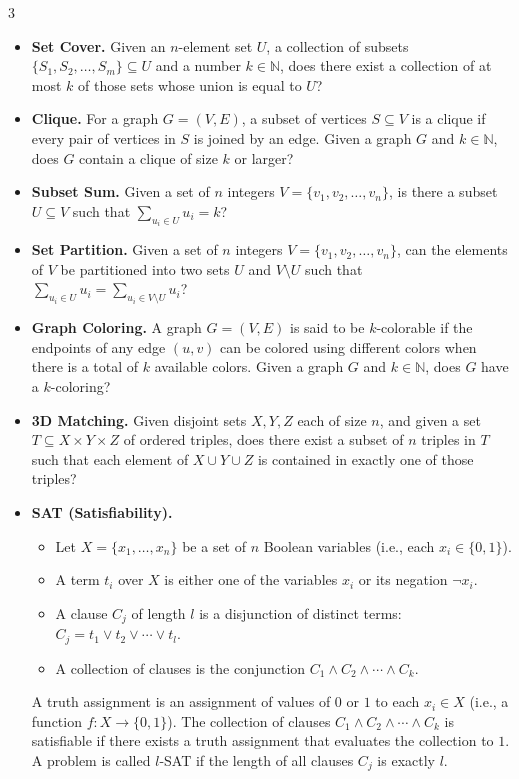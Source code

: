 \documentclass[letterpaper]{article}
\begin{document}
\begin{multicols*}{3}
\begin{itemize}
        \item \textbf{Set Cover.} Given an $n$-element set $U$, a collection of subsets $\{S_1, S_2, \ldots, S_m\} \subseteq U$ and a number $k \in \mathbb{N}$, does there exist a collection of at most $k$ of those sets whose union is equal to $U$?

        \item \textbf{Clique.} For a graph $G = (V,E)$, a subset of vertices $S \subseteq V$ is a clique if every pair of vertices in $S$ is joined by an edge. Given a graph $G$ and $k \in \mathbb{N}$, does $G$ contain a clique of size $k$ or larger?

        \item \textbf{Subset Sum.} Given a set of $n$ integers $V = \{v_1, v_2, \ldots, v_n\}$, is there a subset $U \subseteq V$ such that $\sum_{u_i \in U} u_i = k$?

        \item \textbf{Set Partition.} Given a set of $n$ integers $V = \{v_1, v_2, \ldots, v_n\}$, can the elements of $V$ be partitioned into two sets $U$ and $V \setminus U$ such that $\sum_{u_i \in U} u_i = \sum_{u_i \in V \setminus U} u_i$?

        \item \textbf{Graph Coloring.} A graph $G = (V,E)$ is said to be $k$-colorable if the endpoints of any edge $(u,v)$ can be colored using different colors when there is a total of $k$ available colors. Given a graph $G$ and $k \in \mathbb{N}$, does $G$ have a $k$-coloring?

        \item \textbf{3D Matching.} Given disjoint sets $X, Y, Z$ each of size $n$, and given a set $T \subseteq X \times Y \times Z$ of ordered triples, does there exist a subset of $n$ triples in $T$ such that each element of $X \cup Y \cup Z$ is contained in exactly one of those triples?

        \item \textbf{SAT (Satisfiability).}
              \begin{itemize}
                  \item Let $X = \{x_1, \ldots, x_n\}$ be a set of $n$ Boolean variables (i.e., each $x_i \in \{0,1\}$).
                  \item A term $t_i$ over $X$ is either one of the variables $x_i$ or its negation $\neg x_i$.
                  \item A clause $C_j$ of length $l$ is a disjunction of distinct terms: $C_j = t_1 \vee t_2 \vee \cdots \vee t_l$.
                  \item A collection of clauses is the conjunction $C_1 \wedge C_2 \wedge \cdots \wedge C_k$.
              \end{itemize}
              A truth assignment is an assignment of values of $0$ or $1$ to each $x_i \in X$ (i.e., a function $f : X \to \{0,1\}$). The collection of clauses $C_1 \wedge C_2 \wedge \cdots \wedge C_k$ is satisfiable if there exists a truth assignment that evaluates the collection to $1$. A problem is called $l$-SAT if the length of all clauses $C_j$ is exactly $l$.


\end{itemize}
\end{multicols*}
\end{document}

